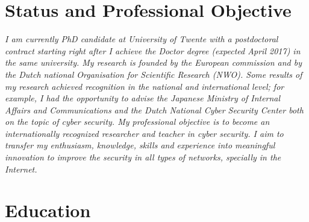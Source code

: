 \documentclass[print]{styles/friggeri-cv-mac} %
\begin{document}
\section{Status and Professional Objective}\vspace{-10pt}
\noindent\setlength\parindent{12pt}\textit{
I am currently PhD candidate at University of
Twente with a postdoctoral contract starting right after I achieve the
Doctor degree (expected April 2017) in the same university. 
My research is founded by the European commission and by the Dutch national
Organisation for Scientific Research (NWO). Some results of my research achieved recognition in the national and international level; for example, I had the opportunity to advise the Japanese Ministry of Internal Affairs and
Communications and the Dutch National Cyber Security Center both on the topic of cyber security.
My professional objective is to become an internationally recognized researcher and teacher in cyber security. I aim to transfer my
enthusiasm, knowledge, skills and experience into meaningful innovation to
improve the security in all types of networks, specially in the Internet.
}


\setlength\parindent{0pt}
\section{Education}\vspace{-5pt}
\end{document}
